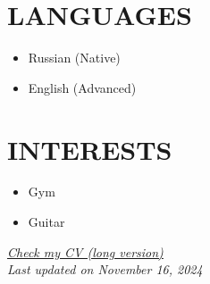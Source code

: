 \documentclass[11pt,a4paper]{moderncv}
\newcommand*{\scoreentry}[3][2.5mm]{
    {\bfseries #2} \\
    {\itshape #3}
    \par\addvspace{#1}
}
\begin{document}
\begin{minipage}[t]{0.35\textwidth}

\section{LANGUAGES}
\begin{itemize}
    \item Russian (Native)
    \item English (Advanced)
\end{itemize}

\section{INTERESTS}
\begin{itemize}
    \item Gym
    \item Guitar
\end{itemize}
\end{minipage}

\vspace*{\fill}
\begin{center}
\textit{\href{https://latexonline.cc/compile?git=https://github.com/kisnikser/CV&target=cv.tex&command=xelatex&force=true}{Check my CV (long version)}}\\
\textit{Last updated on November 16, 2024}
\end{center}
\vspace{-0.5cm}
\end{document}
